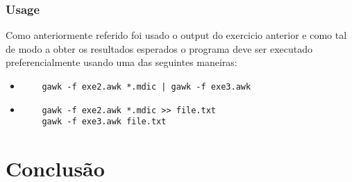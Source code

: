 \documentclass{llncs}
\begin{document}
\subsubsection{Usage}
Como anteriormente referido foi usado o output do exercicio anterior e como tal de modo a obter os resultados esperados o programa deve ser executado preferencialmente usando uma das seguintes maneiras:
\begin{itemize}
    \item \begin{verbatim}
    gawk -f exe2.awk *.mdic | gawk -f exe3.awk
    \end{verbatim}
    \item \begin{verbatim}
    gawk -f exe2.awk *.mdic >> file.txt
    gawk -f exe3.awk file.txt
    \end{verbatim}
\end{itemize}

\section{Conclusão}
\end{document}
